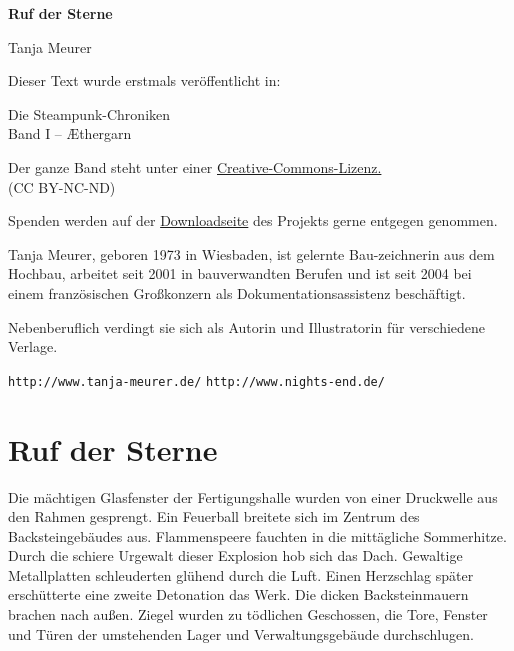 \usepackage[ngerman]{babel}
\usepackage[T1]{fontenc}
\usepackage{textcomp}



\renewcommand*{\tb}{\begin{center}* \quad * \quad *\end{center}}

\newcommand\bigpar\medskip
\newcommand\gedanke\textit


\raggedbottom
\begin{center}
\textbf{\huge\textsf{Ruf der Sterne}}

\bigskip
Tanja Meurer
\end{center}

\bigskip

\begin{flushleft}
Dieser Text wurde erstmals veröffentlicht in:
\begin{center}
Die Steampunk-Chroniken\\
Band I -- Æthergarn
\end{center}

\bigskip

Der ganze Band steht unter einer
\href{http://creativecommons.org/licenses/by-nc-nd/2.0/de/}{Creative-Commons-Lizenz.} \\
(CC BY-NC-ND)

\bigskip

Spenden werden auf der
\href{http://steampunk-chroniken.de/download}{Downloadseite}
des Projekts gerne entgegen genommen.

\vfill

Tanja Meurer, geboren 1973 in Wiesbaden, ist gelernte
Bau-zeichnerin aus dem Hochbau, arbeitet seit 2001 in bauverwandten
Berufen und ist seit 2004 bei einem französischen Großkonzern als
Dokumentationsassistenz beschäftigt.

Nebenberuflich verdingt sie sich als Autorin und Illustratorin für
verschiedene Verlage.

\texttt{http://www.tanja-meurer.de/}
\texttt{http://www.nights-end.de/}

\end{flushleft}


\section{Ruf der Sterne}

Die mächtigen Glasfenster der Fertigungshalle wurden von einer
Druckwelle aus den Rahmen gesprengt. Ein Feuerball breitete sich im
Zentrum des Backsteingebäudes aus. Flammenspeere fauchten in die
mittägliche Sommerhitze. Durch die schiere Urgewalt dieser
Explosion hob sich das Dach. Gewaltige Metallplatten schleuderten
glühend durch die Luft. Einen Herzschlag später erschütterte eine
zweite Detonation das Werk. Die dicken Backsteinmauern brachen nach
außen. Ziegel wurden zu tödlichen Geschossen, die Tore, Fenster und
Türen der umstehenden Lager und Verwaltungsgebäude durchschlugen.

